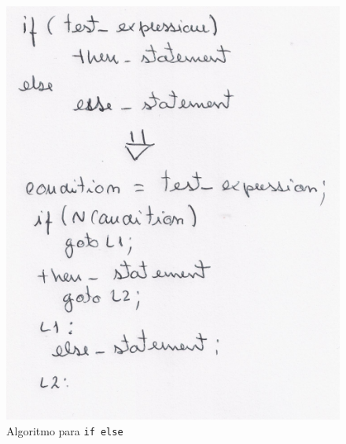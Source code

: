 \begin{figure}[<+htpb+>]
	\centering
	\includegraphics[scale=0.75]{./report/img/ifelse.png}
	\caption{Algoritmo para \texttt{if else}}
\label{fig:figure1}
\end{figure}
